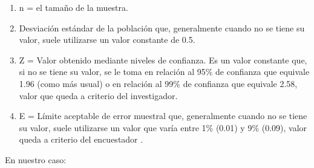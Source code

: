                 \begin{enumerate}
                    \item[]{n = el tamaño de la muestra.}
                    \item[]{Desviación estándar de la población que, generalmente cuando no se tiene su valor, suele utilizarse un valor constante de 0.5.}
                    \item[]{Z = Valor obtenido mediante niveles de confianza. Es un valor constante que, si no se tiene su valor, se le toma en relación al 95{\%} de confianza que equivale 1.96 (como más usual) o en relación al 99{\%} de confianza que equivale 2.58, valor que queda a criterio del investigador.}
                    \item[]{E = Límite aceptable de error muestral que, generalmente cuando no se tiene su valor, suele utilizarse un valor que varía entre 1{\%} (0.01) y 9{\%} (0.09), valor queda a criterio del encuestador  {\cite{sampieri1997}}.}
                \end{enumerate}\par
                En nuestro caso:\par
                \vskip 0.3cm  
